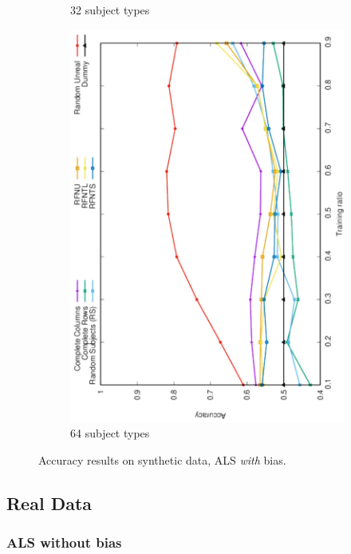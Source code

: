 \documentclass[10pt, conference, compsocconf]{IEEEtran}
\begin{document}
\begin{figure}
\begin{subfigure}[b]{0.4\linewidth}
        \caption{32 subject types}
\end{subfigure}
\hfill
\begin{subfigure}[b]{0.4\linewidth}
        \includegraphics[width=0.8\columnwidth, angle=-90]{data/results/means_of_results/ALS-Bias/Synthetic/synthetic_subject_types/ALS-Bias-64-types.pdf}
        \caption{64 subject types}
\end{subfigure}
\caption{Accuracy results on synthetic data, ALS \emph{with} bias.}
\label{fig:results-synthetic-als-bias}
\end{figure}

\subsection{Real Data}

\subsubsection{ALS without bias}
\end{document}
